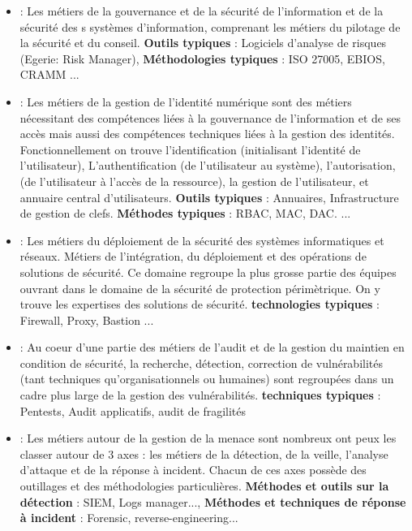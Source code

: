  \begin{itemize}
  \item \textbf{} : Les métiers de la gouvernance et de la sécurité de l'information et de la sécurité des s systèmes d'information, comprenant les métiers du pilotage de la sécurité et du conseil. \textbf{Outils typiques} : Logiciels d'analyse de risques (Egerie: Risk Manager),  \textbf{Méthodologies typiques} : ISO 27005, EBIOS, CRAMM ... %
  
  \item \textbf{ }: Les métiers de la gestion de l'identité numérique sont des métiers nécessitant des compétences liées à la gouvernance de l'information et de ses accès mais aussi des compétences techniques liées à la gestion des identités. Fonctionnellement on trouve l'identification (initialisant l'identité de l'utilisateur),  L’authentification (de l’utilisateur au système), l’autorisation, (de l'utilisateur à l'accès de la ressource), la gestion de l’utilisateur, et annuaire central d’utilisateurs. \textbf{Outils typiques} : Annuaires, Infrastructure de gestion de clefs.  \textbf{Méthodes typiques} : RBAC, MAC, DAC. ...
  \item \textbf{} : Les métiers du déploiement  de la sécurité des systèmes informatiques et réseaux. Métiers de l'intégration, du déploiement et des opérations de solutions de sécurité. Ce domaine regroupe la plus grosse partie des équipes ouvrant dans le domaine de la sécurité de protection périmètrique. On y trouve les expertises des solutions de sécurité.   \textbf{technologies typiques} :  Firewall, Proxy, Bastion ... 
  \item\textbf{ } : Au coeur d'une partie des métiers de l'audit et de la gestion du maintien en condition de sécurité, la recherche, détection, correction de vulnérabilités (tant techniques qu'organisationnels ou humaines) sont regroupées dans un cadre plus large de la gestion des vulnérabilités. \textbf{techniques typiques} : Pentests, Audit applicatifs, audit de fragilités
  \item \textbf{} : Les métiers autour de la gestion de la menace sont nombreux ont peux les classer  autour de 3 axes : les métiers de la détection, de la veille, l'analyse d'attaque et de la réponse à incident. Chacun de ces axes possède des outillages et des méthodologies particulières.  \textbf{Méthodes et outils sur la détection} : SIEM, Logs manager..., \textbf{Méthodes et techniques de réponse à incident} : Forensic, reverse-engineering...

\end{itemize}


